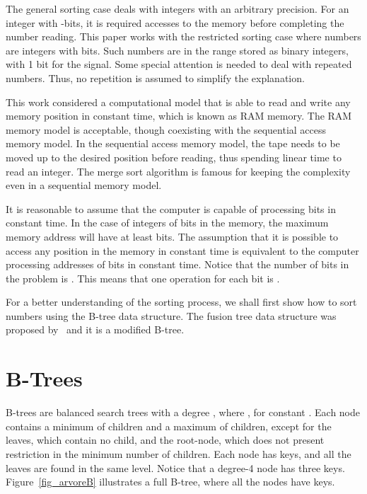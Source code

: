 \documentclass[11pt]{article}
\begin{document}
The general sorting case deals with integers with an arbitrary precision. For an integer with -bits, it is required  accesses to the memory before completing the number reading. This paper works with the restricted sorting case where numbers are integers with  bits. Such numbers are in the range   stored as binary integers, with 1 bit for the signal. Some special attention is needed to deal with repeated numbers. Thus, no repetition is assumed to simplify the explanation.






This work considered a computational model that is able to read and write any memory position in constant time, which is known as RAM memory. The RAM memory model is acceptable, though coexisting with the sequential access memory model. In the sequential access memory model, the tape needs to be moved up to the desired position before reading, thus spending linear time to read an integer. The merge sort algorithm is famous for keeping the complexity  even in a sequential memory model.





It is reasonable to assume that the computer is capable of processing  bits in constant time. In the case of  integers of  bits in the memory, the maximum memory address will have at least  bits. The assumption that it is possible to access any position in the memory in constant time is equivalent to the computer processing 
addresses of  bits in constant time. Notice that the number of bits in the problem is . This means that one operation for each bit is .




For a better understanding of the sorting process, we shall first show how to sort  numbers using the B-tree data structure. The fusion tree data structure was proposed by~\cite{fredman} and it is a modified B-tree.




\section{B-Trees}

B-trees are balanced search trees with a degree , where , for constant . Each node contains a minimum of  children and a maximum of  children, except for the leaves, which contain no child, and the root-node, which does not present restriction in the minimum number of children. Each node has  keys, and all the leaves are found in the same level. Notice that a degree-4 node has three keys. Figure~\ref{fig_arvoreB} illustrates a full B-tree, where all the nodes have  keys.
\end{document}
